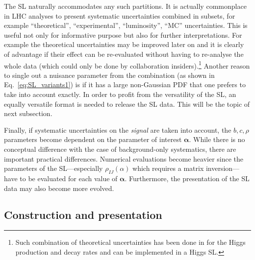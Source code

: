\documentclass[11pt]{article}
\begin{document}
The SL naturally accommodates any such partitions. It is actually  commonplace in LHC analyses   to present systematic uncertainties combined in subsets, for example ``theoretical'', ``experimental'', ``luminosity'', ``MC'' uncertainties. 
This is useful %
not only for informative purpose but also for further interpretations. 
For example the theoretical uncertainties may be improved later on %
and it is clearly of advantage if their effect can be re-evaluated without having to re-analyse the whole data (which could only be done by collaboration insiders).\footnote{Such combination of theoretical uncertainties  has been done in \cite{Arbey:2016kqi}  for the Higgs production and decay rates and can be implemented in a Higgs SL.}
Another reason to single out a nuisance parameter  from the combination (as shown in Eq.~\eqref{eq:SL_variants1})
is if it has a large non-Gaussian PDF that one prefers to take into account exactly.
In order to profit from the  versatility of the SL, an equally  versatile format is needed to release the SL data. This will be the topic of next subsection.

Finally, if systematic uncertainties on the \textit{signal} are taken into account, the $b,c,\rho$ parameters  become dependent on the parameter of interest ${\bm \alpha}$. While there is no conceptual difference with the case  of background-only systematics, there are important practical differences. Numerical evaluations  become heavier  since  the parameters of the SL---especially $\rho_{IJ}(\alpha)$ which requires a matrix inversion---have to be evaluated for each value of ${\bm \alpha}$. Furthermore, the presentation of the SL data may also become more evolved.





\subsection{Construction and  presentation}
\end{document}
